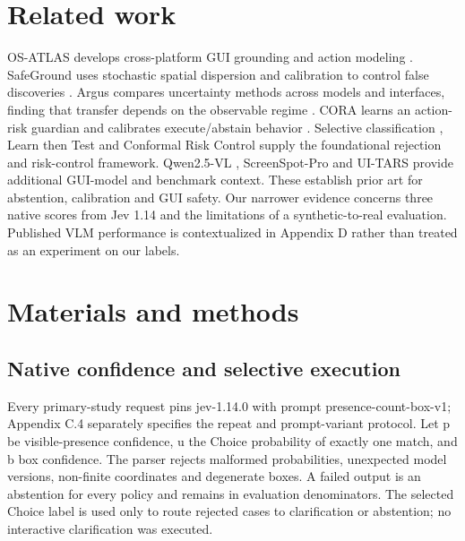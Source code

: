 \documentclass[10pt]{article}
\begin{document}
\section*{Related work}
OS-ATLAS develops cross-platform GUI grounding and action modeling \citep{ref1}. SafeGround uses stochastic spatial dispersion and calibration to control false discoveries \citep{ref2}. Argus compares uncertainty methods across models and interfaces, finding that transfer depends on the observable regime \citep{ref3}. CORA learns an action-risk guardian and calibrates execute/abstain behavior \citep{ref4}. Selective classification \citep{ref10}, Learn then Test \citep{ref11} and Conformal Risk Control \citep{ref12} supply the foundational rejection and risk-control framework. Qwen2.5-VL \citep{ref13}, ScreenSpot-Pro \citep{ref14} and UI-TARS \citep{ref15} provide additional GUI-model and benchmark context. These establish prior art for abstention, calibration and GUI safety. Our narrower evidence concerns three native scores from Jev 1.14 and the limitations of a synthetic-to-real evaluation. Published VLM performance is contextualized in Appendix D rather than treated as an experiment on our labels.

\section*{Materials and methods}
\subsection*{Native confidence and selective execution}
Every primary-study request pins jev-1.14.0 with prompt presence-count-box-v1; Appendix C.4 separately specifies the repeat and prompt-variant protocol. Let p be visible-presence confidence, u the Choice probability of exactly one match, and b box confidence. The parser rejects malformed probabilities, unexpected model versions, non-finite coordinates and degenerate boxes. A failed output is an abstention for every policy and remains in evaluation denominators. The selected Choice label is used only to route rejected cases to clarification or abstention; no interactive clarification was executed.
\end{document}
